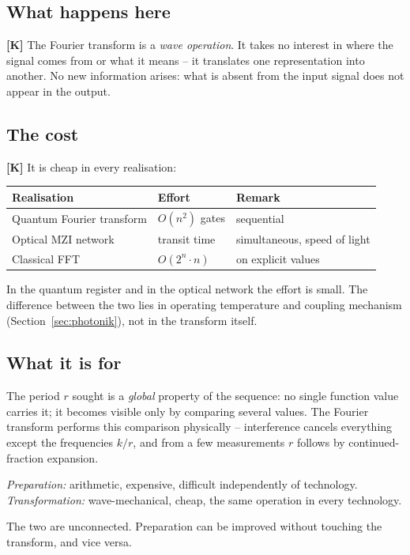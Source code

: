 \subsection{What happens here}

\textbf{[K]} The Fourier transform is a \emph{wave operation}. It takes
no interest in where the signal comes from or what it means -- it
translates one representation into another. No new information arises:
what is absent from the input signal does not appear in the output.

\subsection{The cost}

\textbf{[K]} It is cheap in every realisation:

\begin{center}
\begin{tabular}{lll}
\toprule
Realisation & Effort & Remark \\
\midrule
Quantum Fourier transform & $O(n^2)$ gates & sequential \\
Optical MZI network & transit time & simultaneous, speed of light \\
Classical FFT & $O(2^n \cdot n)$ & on explicit values \\
\bottomrule
\end{tabular}
\end{center}

In the quantum register and in the optical network the effort is small.
The difference between the two lies in operating temperature and
coupling mechanism (Section~\ref{sec:photonik}), not in the transform
itself.

\subsection{What it is for}

The period $r$ sought is a \emph{global} property of the sequence: no
single function value carries it; it becomes visible only by comparing
several values. The Fourier transform performs this comparison
physically -- interference cancels everything except the frequencies
$k/r$, and from a few measurements $r$ follows by continued-fraction
expansion.

\begin{keyresult}
\emph{Preparation:} arithmetic, expensive, difficult independently of
technology.
\emph{Transformation:} wave-mechanical, cheap, the same operation in
every technology.

The two are unconnected. Preparation can be improved without touching
the transform, and vice versa.
\end{keyresult}

